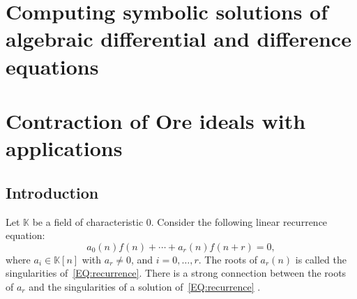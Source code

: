 \documentclass[10pt,a4paper]{article}
\newcommand{\bK}{ {\mathbb  K}}
\begin{document}
\section*{Computing symbolic solutions of algebraic differential and difference equations}

% 
% 

\section{Contraction of Ore ideals with applications} \label{SECT:contraction}

\subsection{Introduction}
Let $\bK$ be a field of characteristic $0$. 
Consider the following linear recurrence equation:
\begin{equation} \label{EQ:recurrence}
 a_0(n)f(n) + \cdots + a_r(n)f(n+r)=0,
\end{equation}
where $a_i \in \bK[n]$ with $a_r \neq 0$, and $i = 0, \ldots, r$. The roots of $a_r(n)$ is called 
the singularities of~\eqref{EQ:recurrence}.  
There is a strong connection between the roots of $a_r$ 
and the singularities of a solution of~\eqref{EQ:recurrence} . 
\end{document}
